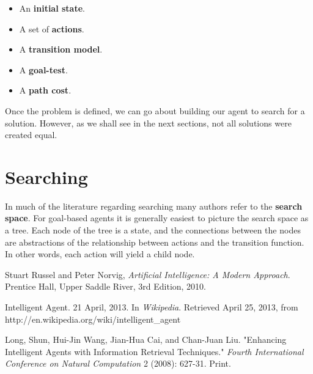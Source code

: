 \documentclass[a4paper,11pt]{report}
\begin{document}
\begin{itemize}
\item An \textbf{initial state}.
\item A set of \textbf{actions}.
\item A \textbf{transition model}.
\item A \textbf{goal-test}.
\item A \textbf{path cost}.\cite{norvig}
\end{itemize}

Once the problem is defined, we can go about building our agent to search for
a solution.  However, as we shall see in the next sections, not all solutions
were created equal.

\section{Searching}
In much of the literature regarding searching many authors refer to the
\textbf{search space}.  For goal-based agents it is generally easiest to 
picture the search space as a tree.  Each node of the tree is a state, and
the connections between the nodes are abstractions of the relationship between
actions and the transition function.  In other words, each action will yield a
child node.


\begin{thebibliography}{9}

    Stuart Russel and Peter Norvig,
    \textit{Artificial Intelligence: A Modern Approach}.
    Prentice Hall, Upper Saddle River,
    3rd Edition,
    2010.

    Intelligent Agent. 21 April, 2013.  
    In \textit{Wikipedia}.  Retrieved April 25, 2013,
    from http://en.wikipedia.org/wiki/intelligent\_agent

    Long, Shun, Hui-Jin Wang, Jian-Hua Cai, and Chan-Juan Liu. 
    "Enhancing Intelligent Agents with Information Retrieval Techniques." 
    \textit{Fourth International Conference on Natural Computation} 2 
    (2008): 627-31. Print.

\end{thebibliography}
\end{document}

